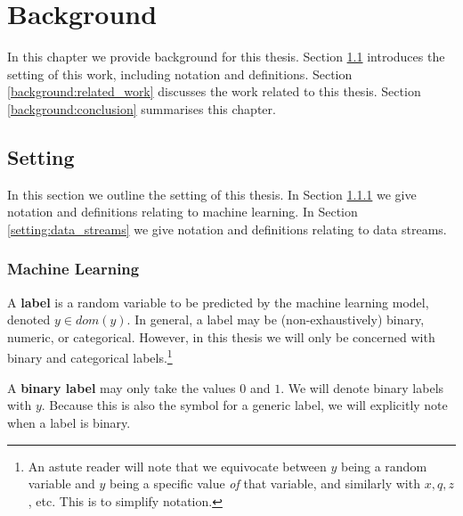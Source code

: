 \chapter{Background} \label{chapt:Background}

In this chapter we provide background for this thesis. Section \ref{background:setting} introduces the setting of this work, including notation and definitions. Section \ref{background:related_work} discusses the work related to this thesis. Section \ref{background:conclusion} summarises this chapter.


\section{Setting} \label{background:setting}

In this section we outline the setting of this thesis. In Section \ref{setting:ml} we give notation and definitions relating to machine learning.  In Section \ref{setting:data_streams} we give notation and definitions relating to data streams.  

\subsection{Machine Learning} \label{setting:ml}

\newcommand{\y}[1]{y^{(#1)}}
\newcommand{\yhat}[1]{\hat{y}^{(#1)}}
\newcommand{\q}[1]{q^{(#1)}}
\newcommand{\qhat}[1]{\hat{q}^{(#1)}}
\newcommand{\id}[1]{\mathds{1}[#1]} %
\newcommand{\x}[1]{x^{(#1)}}
\newcommand{\X}[1]{X^{(#1)}}

A {\bf label} is a random variable to be predicted by the machine learning model, denoted $y\in dom(y)$. In general, a label may be (non-exhaustively) binary, numeric, or categorical. However, in this thesis we will only be concerned with binary and categorical labels.\footnote{An astute reader will note that we equivocate between $y$ being a random variable and $y$ being a specific value {\it of} that variable, and similarly with $x,q,z$, etc. This is to simplify notation.}  

A {\bf binary label} may only take the values $0$ and $1$. We will denote binary labels with $y$. Because this is also the symbol for a generic label, we will explicitly note when a label is binary. 


